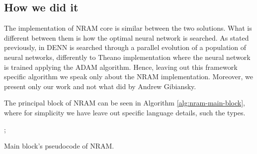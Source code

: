 \subsection{How we did it}
The implementation of NRAM core is similar between the two solutions. What is different between them is how the optimal neural network is searched. As stated previously, in DENN is searched through a parallel evolution of a population of neural networks, differently to Theano implementation where the neural network is trained applying the ADAM algorithm. Hence, leaving out this framework specific algorithm we speak only about the NRAM implementation. Moreover, we present only our work and not what did by Andrew Gibiansky.

The principal block of NRAM can be seen in Algorithm \ref{alg:nram-main-block}, where for simplicity we have leave out specific language details, such the types.

\begin{algorithm}
	\begin{algorithmic}[1]
            ;
				\newline
				\Else
				\EndIf
				\newline
                \newline
                \EndFor
                \newline
			\EndFor{}
			\newline
		\EndFunction
	\end{algorithmic}
	\caption{Main block's pseudocode of NRAM.}\label{alg:nram-main-block}
\end{algorithm}

